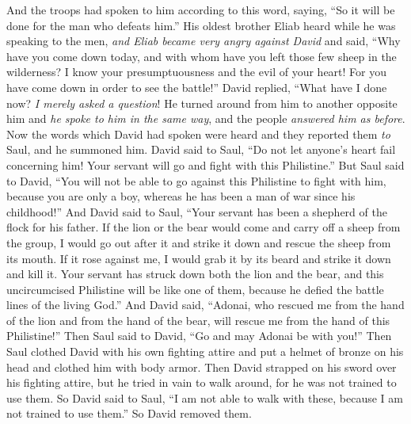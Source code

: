 \begin{biblechapter}
\verse And the troops had spoken to him according to this word, saying, “So it will be done for the man who defeats him.”
\verse His oldest brother Eliab heard while he was speaking to the men, \textit{and Eliab became very angry against David} and said, “Why have you come down today, and with whom have you left those few sheep in the wilderness? I know your presumptuousness and the evil of your heart! For you have come down in order to see the battle!”
\verse David replied, “What have I done now? \textit{I merely asked a question}!
\verse He turned around from him to another opposite him and \textit{he spoke to him in the same way}, and the people \textit{answered him as before}.
 Now the words which David had spoken were heard and they reported them \textit{to} Saul, and he summoned him.
\verse David said to Saul, “Do not let anyone’s heart fail concerning him! Your servant will go and fight with this Philistine.”
\verse But Saul said to David, “You will not be able to go against this Philistine to fight with him, because you are only a boy, whereas he has been a man of war since his childhood!”
\verse And David said to Saul, “Your servant has been a shepherd of the flock for his father. If the lion or the bear would come and carry off a sheep from the group,
\verse I would go out after it and strike it down and rescue the sheep from its mouth. If it rose against me, I would grab it by its beard and strike it down and kill it.
\verse Your servant has struck down both the lion and the bear, and this uncircumcised Philistine will be like one of them, because he defied the battle lines of the living God.”
\verse And David said, “Adonai, who rescued me from the hand of the lion and from the hand of the bear, will rescue me from the hand of this Philistine!” Then Saul said to David, “Go and may Adonai be with you!”
\verse Then Saul clothed David with his own fighting attire and put a helmet of bronze on his head and clothed him with body armor.
\verse Then David strapped on his sword over his fighting attire, but he tried in vain to walk around, for he was not trained to use them. So David said to Saul, “I am not able to walk with these, because I am not trained to use them.” So David removed them.

\end{biblechapter}
